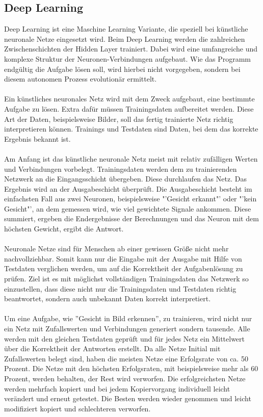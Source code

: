 \documentclass[12pt,oneside,a4paper,parskip]{scrbook}
\begin{document}
\subsection{Deep Learning}
Deep Learning ist eine Maschine Learning Variante, die speziell bei künstliche neuronale Netze eingesetzt wird. Beim Deep Learning werden die zahlreichen Zwischenschichten der Hidden Layer trainiert. Dabei wird eine umfangreiche und komplexe Struktur der Neuronen-Verbindungen aufgebaut. Wie das Programm endgültig die Aufgabe lösen soll, wird hierbei nicht vorgegeben, sondern bei diesem autonomen Prozess evolutionär ermittelt.
\\\\
Ein künstliches neuronales Netz wird mit dem Zweck aufgebaut, eine bestimmte Aufgabe zu lösen. Extra dafür müssen Trainingsdaten aufbereitet werden. Diese Art der Daten, beispielsweise Bilder, soll das fertig trainierte Netz richtig interpretieren können. Trainings und Testdaten sind Daten, bei dem das korrekte Ergebnis bekannt ist.
\\\\
Am Anfang ist das künstliche neuronale Netz meist mit relativ zufälligen Werten und Verbindungen vorbelegt. Trainingsdaten werden dem zu trainierenden Netzwerk an die Eingangsschicht übergeben. Diese durchlaufen das Netz. Das Ergebnis wird an der Ausgabeschicht überprüft. Die Ausgabeschicht besteht im einfachsten Fall aus zwei Neuronen, beispielsweise "'Gesicht erkannt"' oder "'kein Gesicht"', an dem gemessen wird, wie viel gewichtete Signale ankommen. Diese summiert, ergeben die Endergebnisse der Berechnungen und das Neuron mit dem höchsten Gewicht, ergibt die Antwort.
\\\\
Neuronale Netze sind für Menschen ab einer gewissen Größe nicht mehr nachvollziehbar. Somit kann nur die Eingabe mit der Ausgabe mit Hilfe von Testdaten verglichen werden, um auf die Korrektheit der Aufgabenlösung zu prüfen. Ziel ist es mit möglichst vollständigen Trainingsdaten das Netzwerk so einzustellen, dass diese nicht nur die Trainingsdaten und Testdaten richtig beantwortet, sondern auch unbekannt Daten korrekt interpretiert.
\\\\
Um eine Aufgabe, wie ''Gesicht in Bild erkennen'', zu trainieren, wird nicht nur ein Netz mit Zufallswerten und Verbindungen generiert sondern tausende. Alle werden mit den gleichen Testdaten geprüft und für jedes Netz ein Mittelwert über die Korrektheit der Antworten erstellt. Da alle Netze Initial mit Zufallswerten belegt sind, haben die meisten Netze eine Erfolgsrate von ca. 50 Prozent. Die Netze mit den höchsten Erfolgsraten, mit beispielsweise mehr als 60 Prozent, werden behalten, der Rest wird verworfen. Die erfolgreichsten Netze werden mehrfach kopiert und bei jedem Kopiervorgang individuell leicht verändert und erneut getestet. Die Besten werden wieder genommen und leicht modifiziert kopiert und schlechteren verworfen.
\end{document}
